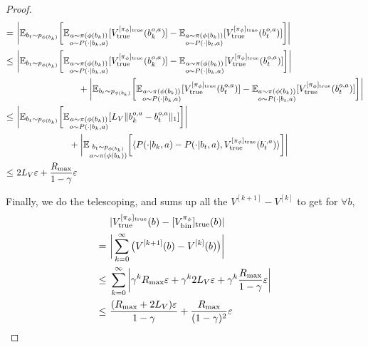 \documentclass[twoside]{article}
\begin{document}
\begin{proof}
\begin{align*}
            =&\ \bigg|\mathbb{E}_{b_t\sim p_{\phi(b_k)}}\bigg[\mathbb{E}_{\substack{a\sim \pi(\phi(b_k))\\o\sim P(\cdot|b_k,a)}}[V_{\rm true}^{[\pi_\phi]_{\rm true}}(b_k^{o,a})]-\mathbb{E}_{\substack{a\sim \pi(\phi(b_k))\\o\sim P(\cdot|b_t,a)}}[V_{\rm true}^{[\pi_\phi]_{\rm true}}(b_t^{o,a})]\bigg]\bigg|\\
            \leq&\ \bigg|\mathbb{E}_{b_t\sim p_{\phi(b_k)}}\bigg[\mathbb{E}_{\substack{a\sim \pi(\phi(b_k))\\o\sim P(\cdot|b_k,a)}}[V_{\rm true}^{[\pi_\phi]_{\rm true}}(b_k^{o,a})]-\mathbb{E}_{\substack{a\sim \pi(\phi(b_k))\\o\sim P(\cdot|b_k,a)}}[V_{\rm true}^{[\pi_\phi]_{\rm true}}(b_t^{o,a})]\bigg]\bigg|\\
            &\qquad\qquad\qquad\quad+
            \bigg|\mathbb{E}_{b_t\sim p_{\phi(b_k)}}\bigg[\mathbb{E}_{\substack{a\sim \pi(\phi(b_k))\\o\sim P(\cdot|b_k,a)}}[V_{\rm true}^{[\pi_\phi]_{\rm true}}(b_t^{o,a})]-\mathbb{E}_{\substack{a\sim \pi(\phi(b_k))\\o\sim P(\cdot|b_t,a)}}[V_{\rm true}^{[\pi_\phi]_{\rm true}}(b_t^{o,a})]\bigg]\bigg|\\
            \leq&\ \bigg|\mathbb{E}_{b_t\sim p_{\phi(b_k)}}\bigg[\mathbb{E}_{\substack{a\sim \pi(\phi(b_k))\\o\sim P(\cdot|b_k,a)}}[L_V\|b_k^{o,a}-b_t^{o,a}\|_1]\bigg]\bigg|\\&\qquad\qquad\qquad+\bigg|\mathbb{E}_{\substack{b_t\sim p_{\phi(b_k)}\\a\sim\pi(\phi(b_k))}}\bigg[
            \langle P(\cdot|b_k,a)-P(\cdot|b_t,a),V_{\rm true}^{[\pi_\phi]_{\rm true}}(b_t^{\cdot,a}) \rangle
            \bigg]\bigg|\\
            \leq&\ 2L_V\varepsilon+\frac{R_{\rm max}}{1-\gamma}\varepsilon
        \end{align*}
        \endgroup

        Finally, we do the telescoping, and sums up all the $V^{[k+1]}-V^{[k]}$ to get for $\forall b$,
        \begin{align}
            &\ |{V}^{[\pi_\phi]_{\rm true}}_{\rm true}(b)-[{V}^{\pi_\phi}_{\rm bin}]_{\rm true}(b)|\\
            =&\ \bigg|\sum_{k=0}^\infty\big(V^{[k+1]}(b)-V^{[k]}(b)\big)\bigg|\\
            \leq&\ \sum_{k=0}^\infty\bigg|\gamma^kR_{\rm max}\varepsilon+{\gamma^k}2L_V\varepsilon+\gamma^k\frac{R_{\rm max}}{1-\gamma}\varepsilon\bigg|\\
            \leq&\ \frac{(R_{\rm max}+2L_V)\varepsilon}{1-\gamma}+\frac{R_{\rm max}}{(1-\gamma)^2}\varepsilon
        \end{align}
    \end{proof}
\end{document}
